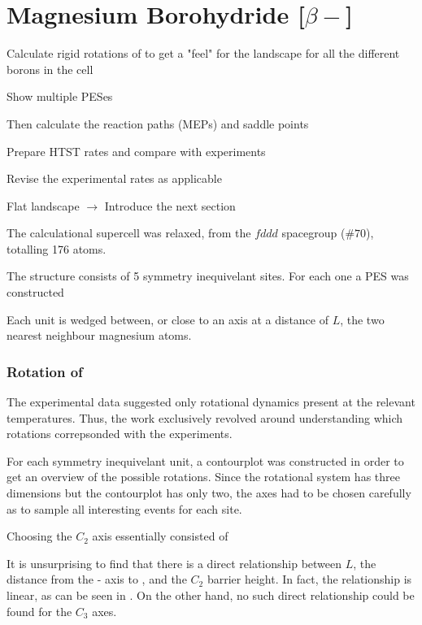 \section{Magnesium Borohydride [$\beta-$]}
\label{sec:borohydrides-magnesium}

\bit
\item Calculate rigid rotations of  to get a "feel" for the landscape for all the different borons in the cell
\item Show multiple PESes
\item Then calculate the reaction paths (MEPs) and saddle points
\item Prepare HTST rates and compare with experiments
\item Revise the experimental rates as applicable
\item Flat landscape $\rightarrow$ Introduce the next section
\eit

The calculational supercell was relaxed, from the  $fddd$ spacegroup ($\#70$), totalling 176 atoms.

The structure consists of 5 symmetry inequivelant  sites.
For each one a PES was constructed




Each  unit is wedged between, or close to an axis at a distance of $L$, the two nearest neighbour magnesium atoms. \expand

\subsubsection{Rotation of }
The experimental data suggested only rotational dynamics present at the relevant temperatures.
Thus, the work exclusively revolved around understanding which rotations correpsonded with the experiments.

For each symmetry inequivelant  unit, a contourplot was constructed in order to get an overview of the possible rotations.
Since the rotational system has three dimensions but the contourplot has only two, the axes had to be chosen carefully as to sample all interesting events for each site.


Choosing the $C_2$ axis essentially consisted of

It is unsurprising to find that there is a direct relationship between $L$, the distance from the - axis to , and the $C_2$ barrier height.
In fact, the relationship is linear, as can be seen in .
On the other hand, no such direct relationship could be found for the $C_3$ axes.


\incomplete
